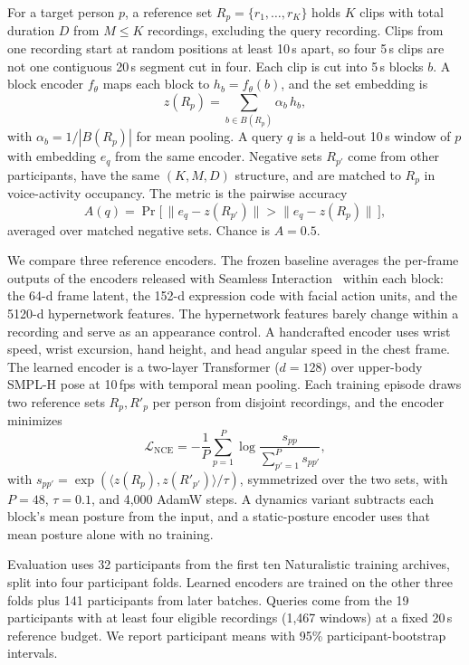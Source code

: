 For a target person $p$, a reference set $R_p = \{r_1, \dots, r_K\}$ holds $K$ clips with total duration $D$ from $M \le K$ recordings, excluding the query recording. Clips from one recording start at random positions at least 10\,s apart, so four 5\,s clips are not one contiguous 20\,s segment cut in four. Each clip is cut into 5\,s blocks $b$. A block encoder $f_\theta$ maps each block to $h_b = f_\theta(b)$, and the set embedding is
\begin{equation}
  z(R_p) = \sum_{b \in B(R_p)} \alpha_b\, h_b ,
\end{equation}
with $\alpha_b = 1/|B(R_p)|$ for mean pooling. A query $q$ is a held-out 10\,s window of $p$ with embedding $e_q$ from the same encoder. Negative sets $R_{p'}$ come from other participants, have the same $(K, M, D)$ structure, and are matched to $R_p$ in voice-activity occupancy. The metric is the pairwise accuracy
\begin{equation}
  A(q) = \Pr\big[\, \lVert e_q - z(R_{p'}) \rVert > \lVert e_q - z(R_p) \rVert \,\big],
\end{equation}
averaged over matched negative sets. Chance is $A = 0.5$.

We compare three reference encoders. The frozen baseline averages the per-frame outputs of the encoders released with Seamless Interaction~\citep{agrawal2025seamless} within each block: the 64-d frame latent, the 152-d expression code with facial action units, and the 5120-d hypernetwork features. The hypernetwork features barely change within a recording and serve as an appearance control. A handcrafted encoder uses wrist speed, wrist excursion, hand height, and head angular speed in the chest frame. The learned encoder is a two-layer Transformer ($d = 128$) over upper-body SMPL-H pose at 10\,fps with temporal mean pooling. Each training episode draws two reference sets $R_p, R'_p$ per person from disjoint recordings, and the encoder minimizes
\begin{equation}
  \mathcal{L}_{\mathrm{NCE}} = -\frac{1}{P} \sum_{p=1}^{P} \log
  \frac{s_{pp}}{\sum_{p'=1}^{P} s_{pp'}},
\end{equation}
with $s_{pp'} = \exp(\langle z(R_p), z(R'_{p'})\rangle/\tau)$, symmetrized over the two sets, with $P = 48$, $\tau = 0.1$, and 4{,}000 AdamW steps. A dynamics variant subtracts each block's mean posture from the input, and a static-posture encoder uses that mean posture alone with no training.

Evaluation uses 32 participants from the first ten Naturalistic training archives, split into four participant folds. Learned encoders are trained on the other three folds plus 141 participants from later batches. Queries come from the 19 participants with at least four eligible recordings (1{,}467 windows) at a fixed 20\,s reference budget. We report participant means with 95\% participant-bootstrap intervals.

